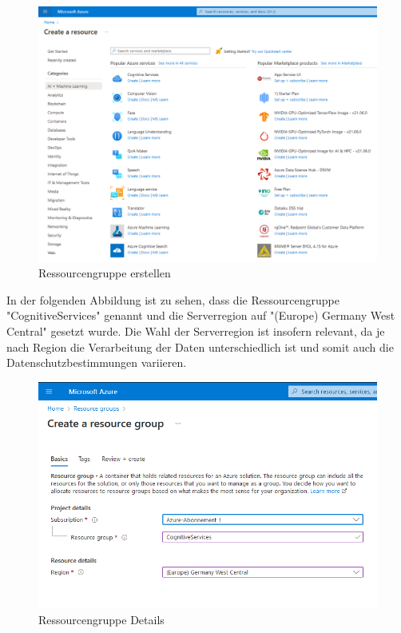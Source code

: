 \begin{figure}[h]
    \centering
    \includegraphics[scale=0.4]{sections/cloud-computing/images/ressourcengruppe.png}
    \caption{Ressourcengruppe erstellen}
    \label{fig:kimldl-comparison}
\end{figure}

\newpage In der folgenden Abbildung ist zu sehen, dass die Ressourcengruppe "CognitiveServices" genannt und die Serverregion auf
"(Europe) Germany West Central" gesetzt wurde. Die Wahl der Serverregion ist insofern relevant, da je nach Region die Verarbeitung der 
Daten unterschiedlich ist und somit auch die Datenschutzbestimmungen variieren.

\begin{figure}[h]
    \centering
    \includegraphics[scale=0.6]{sections/cloud-computing/images/ressourcengruppe-erstellen.png}
    \caption{Ressourcengruppe Details}
    \label{fig:formrecognizer-ressourcegroup}
\end{figure}

